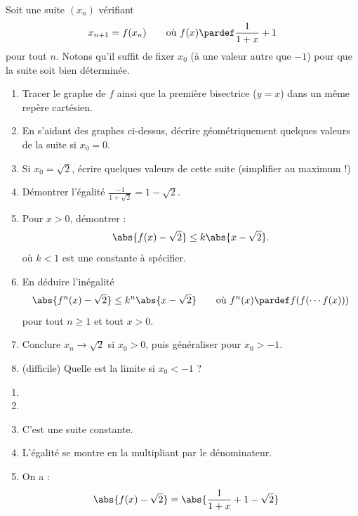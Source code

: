 \documentclass[12pt,french,oneside,a4paper]{memoir} %
\begin{document}
\begin{exo}
  Soit une suite $(x_{n})$ vérifiant
  \begin{equation*}
    x_{n+1} = f(x_{n}) \qquad \text{où $f(x) \pardef \frac{1}{1+x} + 1$}
  \end{equation*}
  pour tout $n$. Notons qu'il suffit de fixer $x_{0}$ (à une valeur autre que $-1$) pour que la suite soit bien déterminée.
  \begin{enumerate}
  \item Tracer le graphe de $f$ ainsi que la première bisectrice ($y=x$) dans un même repère cartésien.
  \item En s'aidant des graphes ci-dessus, décrire géométriquement quelques valeurs de la suite si $x_{0} = 0$.
  \item Si $x_{0} = \sqrt{2}$, écrire quelques valeurs de cette suite (simplifier au maximum !)
  \item Démontrer l'égalité $\frac{-1}{1+\sqrt{2}} = 1 - \sqrt{2}$.
  \item Pour $x > 0$, démontrer :
    \begin{equation*}
      \abs{f(x) - \sqrt{2}} \leq k \abs{x - \sqrt 2}.
    \end{equation*}
    où $k < 1$ est une constante à spécifier.
  \item En déduire l'inégalité
    \begin{equation*}
      \abs{f^{n}(x) - \sqrt{2}} \leq k^{n} \abs{x-\sqrt 2}
      \qquad \text{où $f^{n}(x) \pardef f(f(\cdots f(x)))$}
    \end{equation*}
    pour tout $n \geq 1$ et tout $x > 0$.
  \item Conclure $x_{n} \to \sqrt 2$ si $x_{0} > 0$, puis généraliser pour $x_{0} > -1$. %
  \item (difficile) Quelle est la limite si $x_{0} < -1$ ?
  \end{enumerate}
  \begin{correction}
    \begin{enumerate}
    \item
    \item
    \item C'est une suite constante.
    \item L'égalité se montre en la multipliant par le dénominateur.
    \item On a :
      \begin{align*}
        \abs{f(x) - \sqrt{2}} &= \abs{\frac1{1+x} + 1 - \sqrt{2}} && \\

\end{align*}
\end{enumerate}
\end{correction}
\end{exo}
\end{document}
